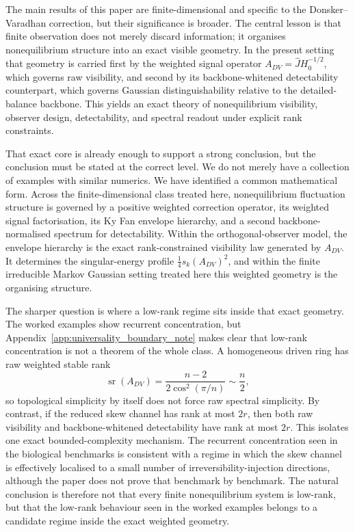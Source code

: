 \documentclass[11pt,a4paper]{article}
\numberwithin{equation}{section}
\theoremstyle{thmcompact}
\theoremstyle{remark}
\begin{document}
The main results of this paper are finite-dimensional and specific to the Donsker--Varadhan correction, but their significance is broader. The central lesson is that finite observation does not merely discard information; it organises nonequilibrium structure into an exact visible geometry. In the present setting that geometry is carried first by the weighted signal operator \(A_{DV}=\widehat J H_0^{-1/2}\), which governs raw visibility, and second by its backbone-whitened detectability counterpart, which governs Gaussian distinguishability relative to the detailed-balance backbone. This yields an exact theory of nonequilibrium visibility, observer design, detectability, and spectral readout under explicit rank constraints.

That exact core is already enough to support a strong conclusion, but the conclusion must be stated at the correct level. We do not merely have a collection of examples with similar numerics. We have identified a common mathematical form. Across the finite-dimensional class treated here, nonequilibrium fluctuation structure is governed by a positive weighted correction operator, its weighted signal factorisation, its Ky Fan envelope hierarchy, and a second backbone-normalised spectrum for detectability. Within the orthogonal-observer model, the envelope hierarchy is the exact rank-constrained visibility law generated by \(A_{DV}\). It determines the singular-energy profile \(\tfrac14 s_k(A_{DV})^2\), and within the finite irreducible Markov Gaussian setting treated here this weighted geometry is the organising structure.

The sharper question is where a low-rank regime sits inside that exact geometry. The worked examples show recurrent concentration, but Appendix~\ref{app:universality_boundary_note} makes clear that low-rank concentration is not a theorem of the whole class. A homogeneous driven ring has raw weighted stable rank
\begin{equation}
\operatorname{sr}(A_{DV})=\frac{n-2}{2\cos^2(\pi/n)}\sim \frac n2,
\end{equation}
so topological simplicity by itself does not force raw spectral simplicity. By contrast, if the reduced skew channel has rank at most \(2r\), then both raw visibility and backbone-whitened detectability have rank at most \(2r\). This isolates one exact bounded-complexity mechanism. The recurrent concentration seen in the biological benchmarks is consistent with a regime in which the skew channel is effectively localised to a small number of irreversibility-injection directions, although the paper does not prove that benchmark by benchmark. The natural conclusion is therefore not that every finite nonequilibrium system is low-rank, but that the low-rank behaviour seen in the worked examples belongs to a candidate regime inside the exact weighted geometry.
\end{document}
